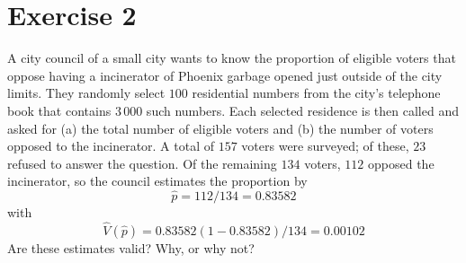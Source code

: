 \documentclass[12pt]{article}
\begin{document}
\section*{Exercise 2}
A city council of a small city wants to know the proportion of eligible voters that
oppose having a incinerator of Phoenix garbage opened just outside of the city limits.
They randomly select $100$ residential numbers from the city’s telephone book that contains $3\,000$ such numbers. Each selected residence is then called and asked for (a) the total number of eligible voters and (b) the number of voters opposed to the incinerator. A total of $157$ voters were surveyed; of these, $23$ refused to answer the question. Of the remaining $134$ voters, $112$ opposed the incinerator, so the council estimates the proportion by
$$\hat{p}=112/134=0.83582$$
with 
$$\hat{V}(\hat{p})=0.83582(1-0.83582)/134=0.00102$$
Are these estimates valid? Why, or why not?\\
\end{document}
